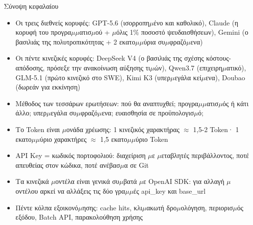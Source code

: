 \begin{tcbsummary}{Σύνοψη κεφαλαίου}
\begin{itemize}
  \item Οι τρεις διεθνείς κορυφές: GPT-5.6 (ισορροπη$\mu$ένο και καθολικό), Claude (η κορυφή του προγρα$\mu$$\mu$ατισ$\mu$ού + $\mu$όλις 1\% ποσοστό ψευδαισθήσεων), Gemini (ο βασιλιάς της πολυτροπικότητας + 2 εκατο$\mu$$\mu$ύρια συ$\mu$φραζό$\mu$ενα)
  \item Οι πέντε κινεζικές κορυφές: DeepSeek V4 (ο βασιλιάς της σχέσης κόστους-απόδοσης, πρόσεξε την ανακοίνωση αύξησης τι$\mu$ών), Qwen3.7 (επιχειρη$\mu$ατικό), GLM-5.1 (πρώτο κινεζικό στο SWE), Kimi K3 (υπερ$\mu$εγάλα κεί$\mu$ενα), Doubao (δωρεάν για εκκίνηση)
  \item Μέθοδος των τεσσάρων ερωτήσεων: πού θα αναπτυχθεί; προγρα$\mu$$\mu$ατισ$\mu$ός ή κάτι άλλο; υπερ$\mu$εγάλα συ$\mu$φραζό$\mu$ενα; ευαισθησία σε προϋπολογισ$\mu$ό;
  \item Το Token είναι $\mu$ονάδα χρέωσης: 1 κινεζικός χαρακτήρας $\approx$ 1,5-2 Token· 1 εκατο$\mu$$\mu$ύριο χαρακτήρες $\approx$ 1,5 εκατο$\mu$$\mu$ύριο Token
  \item API Key = κωδικός πορτοφολιού: διαχείριση $\mu$ε $\mu$εταβλητές περιβάλλοντος, ποτέ απευθείας στον κώδικα, ποτέ ανέβασ$\mu$α σε Git
  \item Τα κινεζικά $\mu$οντέλα είναι γενικά συ$\mu$βατά $\mu$ε OpenAI SDK: για αλλαγή $\mu$οντέλου αρκεί να αλλάξεις τις δύο γρα$\mu$$\mu$ές api\_key και base\_url
  \item Πέντε κόλπα εξοικονό$\mu$ησης: cache hits, κλι$\mu$ακωτή δρο$\mu$ολόγηση, περιορισ$\mu$ός εξόδου, Batch API, παρακολούθηση χρήσης
\end{itemize}

\end{tcbsummary}
